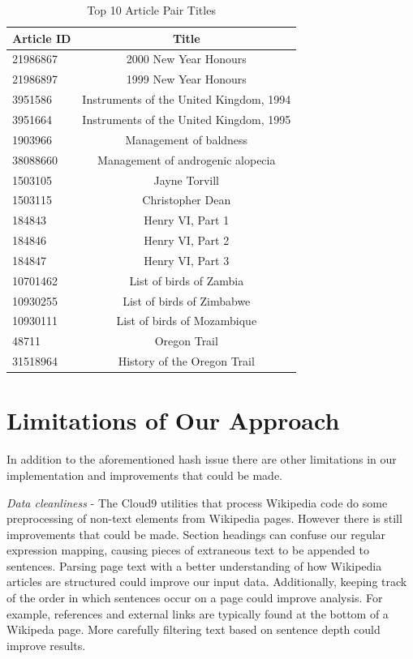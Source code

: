 \documentclass{acm_proc_article-sp}
\begin{document}
\begin{table}
\centering
\caption{Top 10 Article Pair Titles}
\begin{tabular}{| l | c |}
    \hline
    \textbf{Article ID} & \textbf{Title} \\ \hline
    21986867 & 2000 New Year Honours \\ \hline
    21986897 & 1999 New Year Honours \\ \hline
    3951586 & Instruments of the United Kingdom, 1994 \\ \hline
    3951664 & Instruments of the United Kingdom, 1995 \\ \hline
    1903966 & Management of baldness \\ \hline
    38088660 & Management of androgenic alopecia \\ \hline
    1503105 & Jayne Torvill \\ \hline
    1503115 & Christopher Dean \\ \hline
    184843 & Henry VI, Part 1 \\ \hline
    184846 & Henry VI, Part 2 \\ \hline
    184847 & Henry VI, Part 3 \\ \hline
    10701462 & List of birds of Zambia \\ \hline
    10930255 & List of birds of Zimbabwe \\ \hline
    10930111 & List of birds of Mozambique \\ \hline
    48711 & Oregon Trail \\ \hline
    31518964 & History of the Oregon Trail \\
    \hline
\end{tabular}
\end{table}

\section{Limitations of Our Approach}

In addition to the aforementioned hash issue there are other limitations in our implementation and improvements that could be made.

\emph{Data cleanliness} - The Cloud9 utilities that process Wikipedia code do some preprocessing of non-text elements from Wikipedia pages. However there is still improvements that could be made. Section headings can confuse our regular expression mapping, causing pieces of extraneous text to be appended to sentences. Parsing page text with a better understanding of how Wikipedia articles are structured could improve our input data. Additionally, keeping track of the order in which sentences occur on a page could improve analysis. For example, references and external links are typically found at the bottom of a Wikipeda page. More carefully filtering text based on sentence depth could improve results.
\end{document}
